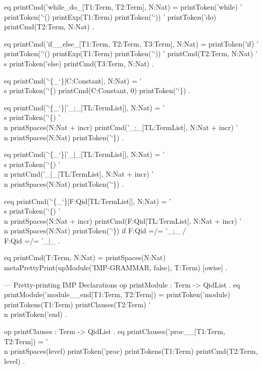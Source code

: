 \documentclass{llncs}%
\begin{document}
    eq printCmd('while_do_[T1:Term, T2:Term], N:Nat) =
       printToken('while) ' printToken('`() printExp(T1:Term) printToken('`)) '
       printToken('do)
       printCmd(T2:Term, N:Nat) .

    eq printCmd('if__else_[T1:Term, T2:Term, T3:Term], N:Nat) =
       printToken('if) ' printToken('`() printExp(T1:Term) printToken('`)) '
           printCmd(T2:Term, N:Nat)
       '\\s printToken('else) printCmd(T3:Term, N:Nat) .

    eq printCmd('`\{_`\}[C:Constant], N:Nat) =
       '\\s printToken('`\{) printCmd(C:Constant, 0) printToken('`\}) .

    eq printCmd('`\{_`\}['_;_[TL:TermList]], N:Nat) =
       '\\s printToken('`\{) '\\n
       printSpaces(N:Nat + incr) printCmd('_;_[TL:TermList], N:Nat + incr) '\\n
       printSpaces(N:Nat) printToken('`\}) .

    eq printCmd('`\{_`\}['_|_[TL:TermList]], N:Nat) =
       '\\s printToken('`\{) '\\n printCmd('_|_[TL:TermList], N:Nat + incr) '\\n
       printSpaces(N:Nat) printToken('`\}) .

    ceq printCmd('`\{_`\}[F:Qid[TL:TermList]], N:Nat) =
       '\\s printToken('`\{) '\\n
       printSpaces(N:Nat + incr) printCmd(F:Qid[TL:TermList], N:Nat + incr) '\\n
       printSpaces(N:Nat) printToken('`\})
    if F:Qid =/= '_;_ /\\ F:Qid =/= '_|_ .

    eq printCmd(T:Term, N:Nat) =
       printSpaces(N:Nat) metaPrettyPrint(upModule('IMP-GRAMMAR, false), T:Term) [owise] .

    --- Pretty-printing IMP Declarations
    op printModule : Term -> QidList .
    eq printModule('module__end[T1:Term, T2:Term]) =
           printToken('module) printTokens(T1:Term)
           printClauses(T2:Term)
           '\\n printToken('end) .

    op printClauses : Term -> QidList .
    eq printClauses('proc__[T1:Term, T2:Term]) =
           '\\n printSpaces(level)
       printToken('proc) printTokens(T1:Term)
       printCmd(T2:Term, level) .
\end{document}
